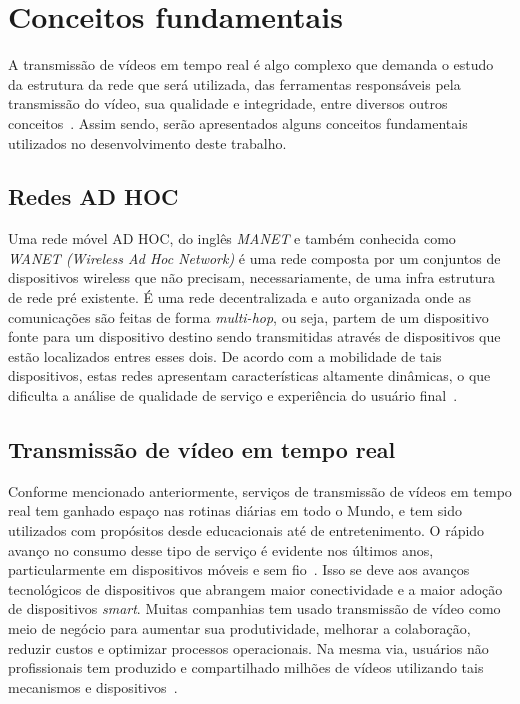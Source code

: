 \documentclass[12pt]{article}
\begin{document}
\section{Conceitos fundamentais} \label{sec:conceitos}

	A transmissão de vídeos em tempo real é algo complexo que demanda o estudo da estrutura da rede que será utilizada, das ferramentas responsáveis pela transmissão do vídeo, sua qualidade e integridade, entre diversos outros conceitos~\cite{Immich2017a}. Assim sendo, serão apresentados alguns conceitos fundamentais utilizados no desenvolvimento deste trabalho.

\subsection{Redes AD HOC}
    Uma rede móvel AD HOC, do inglês \textit{MANET} e também conhecida como \textit{WANET (Wireless Ad Hoc Network)} é uma rede composta por um conjuntos de dispositivos wireless que não precisam, necessariamente, de uma infra estrutura de rede pré existente. É uma rede decentralizada e auto organizada onde as comunicações são feitas de forma \textit{multi-hop}, ou seja, partem de um dispositivo fonte para um dispositivo destino sendo transmitidas através de dispositivos que estão localizados entres esses dois. De acordo com a mobilidade de tais dispositivos, estas redes apresentam características altamente dinâmicas, o que dificulta a análise de qualidade de serviço e experiência do usuário final~\cite{Immich2018}.

\subsection{Transmissão de vídeo em tempo real}
	Conforme mencionado anteriormente, serviços de transmissão de vídeos em tempo real tem ganhado espaço nas rotinas diárias em todo o Mundo, e tem sido utilizados com propósitos desde educacionais até de entretenimento. O rápido avanço no consumo desse tipo de serviço é evidente nos últimos anos, particularmente em dispositivos móveis e sem fio~\cite{Adobe2017}. Isso se deve aos avanços tecnológicos de dispositivos que abrangem maior conectividade e a maior adoção de dispositivos \textit{smart}. Muitas companhias tem usado transmissão de vídeo como meio de negócio para aumentar sua produtividade, melhorar a colaboração, reduzir custos e optimizar processos operacionais. Na mesma via, usuários não profissionais tem produzido e compartilhado milhões de vídeos utilizando tais mecanismos e dispositivos~\cite{Cisco2017}.
\end{document}
